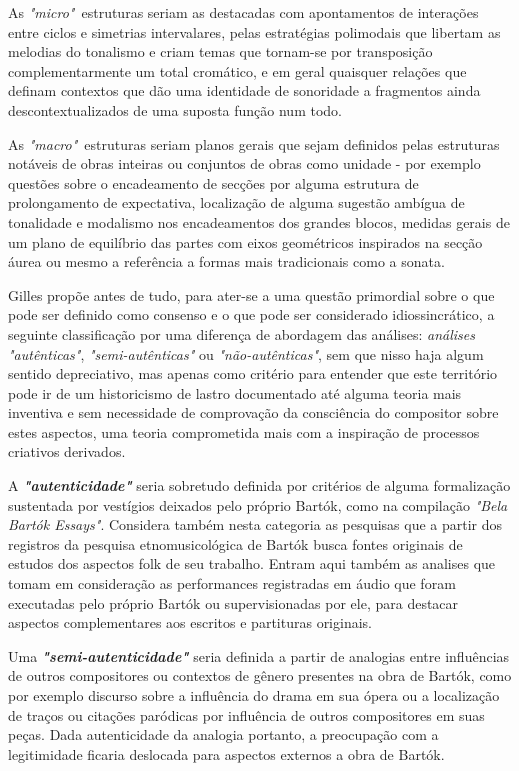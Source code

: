 \documentclass[
	12pt,				%
	openright,			%
	twoside,			%
	a4paper,			%
	english,			%
	french,				%
	spanish,			%
	brazil				%
	]{abntex2}
\begin{document}
As \textit{ "micro"}\ estruturas seriam as destacadas com apontamentos de interações entre ciclos e simetrias intervalares, pelas estratégias polimodais que libertam as melodias do tonalismo e criam temas que tornam-se por transposição complementarmente um total cromático, e em geral quaisquer relações que definam contextos que dão uma identidade de sonoridade a fragmentos ainda descontextualizados de uma suposta função num todo. 

As \textit{"macro"}\ estruturas seriam planos gerais que sejam definidos pelas estruturas notáveis de obras inteiras ou conjuntos de obras como unidade - por exemplo questões sobre o encadeamento de secções por alguma estrutura de prolongamento de expectativa, localização de alguma sugestão ambígua de tonalidade e modalismo nos encadeamentos dos grandes blocos, medidas gerais de um plano de equilíbrio das partes com eixos geométricos inspirados na secção áurea ou mesmo a referência a formas mais tradicionais como a sonata.

Gilles propõe antes de tudo, para ater-se a uma questão primordial sobre o que pode ser definido como consenso e o que pode ser considerado idiossincrático, a seguinte classificação por uma diferença de abordagem das análises: \textit{análises "autênticas"}, \textit{"semi-autênticas"} ou \textit{"não-autênticas"}, sem que nisso haja algum sentido depreciativo, mas apenas como critério para entender que este território pode ir de um historicismo de lastro documentado até alguma teoria mais inventiva e sem necessidade de comprovação da consciência do compositor sobre estes aspectos, uma teoria comprometida mais com a inspiração de processos criativos derivados.

\pagebreak
A \textit{\textbf{"autenticidade"}} seria sobretudo definida por critérios de alguma formalização sustentada por vestígios deixados pelo próprio Bartók, como na compilação \textit{"Bela Bartók Essays"}\cite{bartok1993bela}. Considera também nesta categoria as pesquisas que a partir dos registros da pesquisa etnomusicológica de Bartók busca fontes originais de estudos dos aspectos folk de seu trabalho. Entram aqui também as analises que tomam em consideração as performances registradas em áudio que foram executadas pelo próprio Bartók ou supervisionadas por ele, para destacar aspectos complementares aos escritos e partituras originais. 

Uma \textit{\textbf{"semi-autenticidade"}} seria definida a partir de analogias entre influências de outros compositores ou contextos de gênero presentes na obra de Bartók, como por exemplo discurso sobre a influência do drama em sua ópera ou a localização de traços ou citações paródicas por influência de outros compositores em suas peças. Dada autenticidade da analogia portanto, a preocupação com a legitimidade ficaria deslocada para aspectos externos a obra de Bartók.
\end{document}
